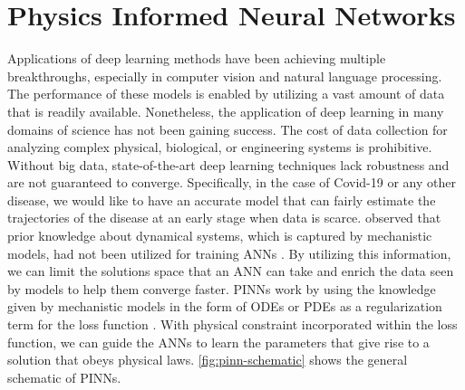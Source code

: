 \section{Physics Informed Neural Networks}
\label{sec:literature-review-physics-informed-neural-network}

Applications of deep learning methods have been achieving multiple breakthroughs, especially in computer vision and natural language processing.
The performance of these models is enabled by utilizing a vast amount of data that is readily available.
Nonetheless, the application of deep learning in many domains of science has not been gaining success.
The cost of data collection for analyzing complex physical, biological, or engineering systems is prohibitive.
Without big data, state-of-the-art deep learning techniques lack robustness and are not guaranteed to converge.
Specifically, in the case of Covid-19 or any other disease, we would like to have an accurate model that can fairly estimate the trajectories of the disease at an early stage when data is scarce.
\citeauthor{raissiPhysicsinformedNeuralNetworks2019} observed that prior knowledge about dynamical systems, which is captured by mechanistic models, had not been utilized for training \glspl{ANN} \cite{raissiPhysicsinformedNeuralNetworks2019}.
By utilizing this information, we can limit the solutions space that an \gls{ANN} can take and enrich the data seen by models to help them converge faster.
\glspl{PINN} work by using the knowledge given by mechanistic models in the form of \glspl{ODE} or \glspl{PDE} as a regularization term for the loss function \cite{raissiPhysicsinformedNeuralNetworks2019, lagarisArtificialNeuralNetworks1998}.
With physical constraint incorporated within the loss function, we can guide the \glspl{ANN} to learn the parameters that give rise to a solution that obeys physical laws.
\autoref{fig:pinn-schematic} shows the general schematic of \glspl{PINN}.

